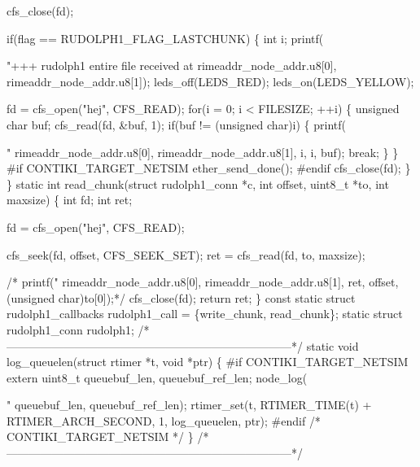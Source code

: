 \begin{DoxyCodeInclude}
{{  cfs\_close(fd);

  \textcolor{keywordflow}{if}(flag == RUDOLPH1\_FLAG\_LASTCHUNK) \{
    \textcolor{keywordtype}{int} i;
    printf(\textcolor{stringliteral}{"+++ rudolph1 entire file received at %
           rimeaddr\_node\_addr.u8[0], rimeaddr\_node\_addr.u8[1]);
    leds\_off(LEDS\_RED);
    leds\_on(LEDS\_YELLOW);

    fd = cfs\_open(\textcolor{stringliteral}{"hej"}, CFS\_READ);
    \textcolor{keywordflow}{for}(i = 0; i < FILESIZE; ++i) \{
      \textcolor{keywordtype}{unsigned} \textcolor{keywordtype}{char} buf;
      cfs\_read(fd, &buf, 1);
      \textcolor{keywordflow}{if}(buf != (\textcolor{keywordtype}{unsigned} \textcolor{keywordtype}{char})i) \{
        printf(\textcolor{stringliteral}{"%
               rimeaddr\_node\_addr.u8[0], rimeaddr\_node\_addr.u8[1],
               i, i, buf);
        \textcolor{keywordflow}{break};
      \}
    \}
\textcolor{preprocessor}{#if CONTIKI\_TARGET\_NETSIM}
    ether\_send\_done();
\textcolor{preprocessor}{#endif}
    cfs\_close(fd);
  \}
\}
\textcolor{keyword}{static} \textcolor{keywordtype}{int}
read\_chunk(\textcolor{keyword}{struct} rudolph1\_conn *c, \textcolor{keywordtype}{int} offset, uint8\_t *to, \textcolor{keywordtype}{int} maxsize)
\{
  \textcolor{keywordtype}{int} fd;
  \textcolor{keywordtype}{int} ret;
  
  fd = cfs\_open(\textcolor{stringliteral}{"hej"}, CFS\_READ);

  cfs\_seek(fd, offset, CFS\_SEEK\_SET);
  ret = cfs\_read(fd, to, maxsize);
  \textcolor{comment}{/*  printf("%
\textcolor{comment}{         rimeaddr\_node\_addr.u8[0], rimeaddr\_node\_addr.u8[1],}
\textcolor{comment}{         ret, offset, (unsigned char)to[0]);*/}
  cfs\_close(fd);
  \textcolor{keywordflow}{return} ret;
\}
\textcolor{keyword}{const} \textcolor{keyword}{static} \textcolor{keyword}{struct }rudolph1\_callbacks rudolph1\_call = \{write\_chunk,
                                                        read\_chunk\};
\textcolor{keyword}{static} \textcolor{keyword}{struct }rudolph1\_conn rudolph1;
\textcolor{comment}{/*---------------------------------------------------------------------------*/}
\textcolor{keyword}{static} \textcolor{keywordtype}{void}
log\_queuelen(\textcolor{keyword}{struct} rtimer *t, \textcolor{keywordtype}{void} *ptr)
\{
\textcolor{preprocessor}{#if CONTIKI\_TARGET\_NETSIM}
  \textcolor{keyword}{extern} uint8\_t queuebuf\_len, queuebuf\_ref\_len;
  node\_log(\textcolor{stringliteral}{"%
           queuebuf\_len,
           queuebuf\_ref\_len);
  rtimer\_set(t, RTIMER\_TIME(t) + RTIMER\_ARCH\_SECOND, 1,
             log\_queuelen, ptr);
\textcolor{preprocessor}{#endif }\textcolor{comment}{/* CONTIKI\_TARGET\_NETSIM */}\textcolor{preprocessor}{}
\}
\textcolor{comment}{/*---------------------------------------------------------------------------*/}

}}}}}}
\end{DoxyCodeInclude}
